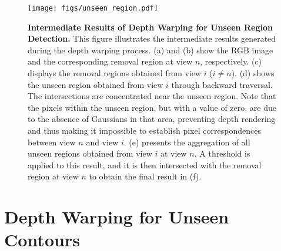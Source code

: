 \begin{figure}[t]
    \centering
    \texttt{[image: figs/unseen\_region.pdf]}
    \caption{\textbf{Intermediate Results of Depth Warping for Unseen Region Detection.} This figure illustrates the intermediate results generated during the depth warping process. (a) and (b) show the RGB image and the corresponding removal region at view $n$, respectively. (c) displays the removal regions obtained from view $i$ ($i \neq n$). (d) shows the unseen region obtained from view $i$ through backward traversal. The intersections are concentrated near the unseen region. Note that the pixels within the unseen region, but with a value of zero, are due to the absence of Gaussians in that area, preventing depth rendering and thus making it impossible to establish pixel correspondences between view $n$ and view $i$. (e) presents the aggregation of all unseen regions obtained from view $i$ at view $n$. A threshold is applied to this result, and it is then intersected with the removal region at view $n$ to obtain the final result in (f).}

    
    \label{fig:unseen_region}
\end{figure}









\section{Depth Warping for Unseen Contours}

\label{sec:depth_warping}

